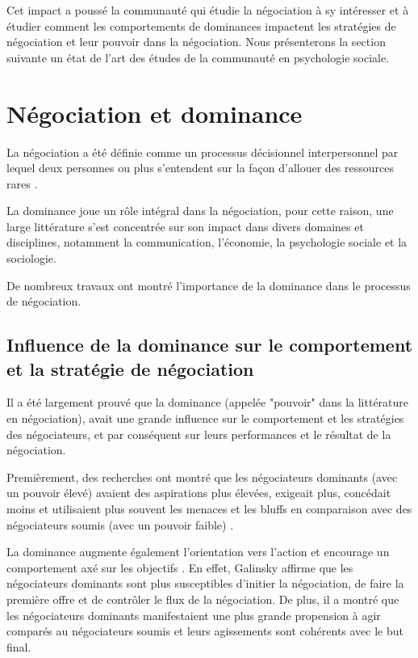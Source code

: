 			Cet impact a poussé la communauté qui étudie la négociation à sy intéresser et à étudier comment les comportements de dominances impactent les stratégies de négociation et leur pouvoir dans la négociation. 
			Nous présenterons la section suivante un état de l'art des études de la communauté en psychologie sociale.
			
			
	\section{Négociation et dominance}
	La négociation a été définie comme un processus décisionnel interpersonnel par lequel deux personnes ou plus s'entendent sur la façon d'allouer des ressources rares \cite{thompson2000mind}. 
	
	La dominance joue un rôle intégral dans la négociation, pour cette raison, une large littérature s'est concentrée sur son impact dans divers domaines et disciplines, notamment la communication, l'économie, la psychologie sociale et la sociologie.
	
	 De nombreux travaux \cite{de1995impact,van2006power,fiske1993controlling} ont montré l'importance de la dominance dans le processus de négociation.
	
	\subsection{Influence de la dominance sur le comportement et la stratégie de négociation}
	
	Il a été largement prouvé que la dominance (appelée "pouvoir" dans la littérature en négociation), avait une grande influence sur le comportement et les stratégies des négociateurs, et par conséquent sur leurs performances et le résultat de la négociation.
	
	Premièrement, des recherches ont montré que les négociateurs dominants (avec un pouvoir élevé) avaient des aspirations plus élevées, exigeait plus, concédait moins et utilisaient plus souvent les menaces et les bluffs en comparaison avec des négociateurs soumis (avec un pouvoir faible) \cite{de1995impact}.
	
	
	 La dominance augmente également l'orientation vers l'action et encourage un comportement axé sur les objectifs \cite{van2006power}. En effet, Galinsky \cite{galinsky2003power} affirme que les négociateurs dominants sont plus susceptibles d'initier la négociation, de faire la première offre et de contrôler le flux de la négociation.  De plus, il a montré que les négociateurs dominants manifestaient une plus grande propension à agir comparés au négociateurs soumis et leurs agissements sont cohérents avec le but final.
	 
